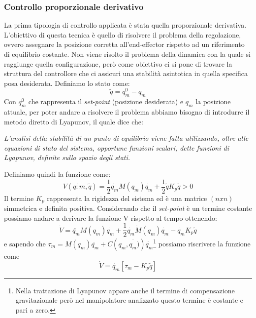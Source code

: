 \subsubsection{Controllo proporzionale derivativo}
La prima tipologia di controllo applicata è stata quella proporzionale derivativa. L'obiettivo di questa tecnica è quello di risolvere il problema della regolazione, ovvero assegnare la posizione corretta all'end-effector rispetto ad un riferimento di equilibrio costante. Non viene risolto il problema della dinamica con la quale si raggiunge quella configurazione, però come obiettivo ci si pone di trovare la struttura del controllore che ci assicuri una stabilità asintotica in quella specifica posa desiderata. Definiamo lo stato come: 
\begin{equation}
\tilde{q} = q^0_m - q_m
\end{equation}
Con $q^0_m$ che rappresenta il \textit{set-point} (posizione desiderata) e $q_m$ la posizione attuale, per poter andare a risolvere il problema abbiamo bisogno di introdurre il metodo diretto di Lyapunov, il quale dice che: 
\begin{center}
\textit{L’analisi della stabilità di un punto di equilibrio viene fatta utilizzando, oltre alle equazioni di stato del sistema, opportune funzioni scalari, dette funzioni di Lyapunov, definite sullo spazio degli stati. }
\end{center}
Definiamo quindi la funzione come:
\begin{equation}
V(\dot{q:m},\tilde{q}) = \frac{1}{2} \dot{q_m}M(q_m)\dot{q_m} + \frac{1}{2} \tilde{q}K_p \tilde{q} >0
\end{equation}
Il termine $K_p$ rappresenta la rigidezza del sistema ed è una matrice $(n x n)$ simmetrica e definita positiva. Considerando che il \textit{set-point} è un termine costante possiamo  andare a derivare la funzione V rispetto al tempo ottenendo:
\begin{equation*}
\dot{V} = \ddot{q_m}M(q_m)\dot{q_m}+\frac{1}{2} \dot{q_m}\dot{M}(q_m)\dot{q_m}-\dot{q_m}K_p\tilde{q}
\end{equation*}
e sapendo che $\tau_m = M(q_m)\ddot{q_m} + C(q_m,\dot{q_m)})\dot{q_m}$\footnote{Nella trattazione di Lyapunov appare anche il termine di compensazione gravitazionale però nel manipolatore analizzato questo termine è costante e pari a zero.} possiamo riscrivere la funzione come 
\begin{equation}
\dot{V} = \dot{q_m} [\tau_m - K_p \tilde{q}]
\label{eq:finLap}
\end{equation}
